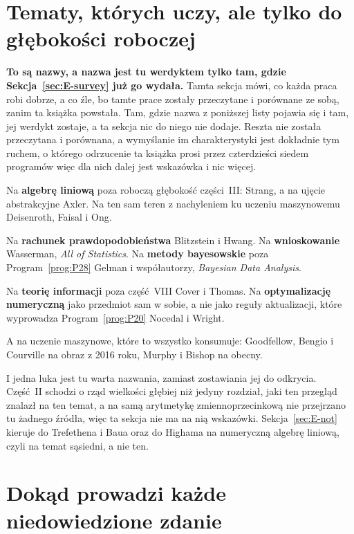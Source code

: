 \section{Tematy, których uczy, ale tylko do głębokości roboczej}
\label{sec:E-depth}

\begin{warning}
\textbf{To są nazwy, a nazwa jest tu werdyktem tylko tam, gdzie
Sekcja~\ref{sec:E-survey} już go wydała.} Tamta sekcja mówi, co każda praca
robi dobrze, a co źle, bo tamte prace zostały przeczytane i porównane ze sobą,
zanim ta książka powstała. Tam, gdzie nazwa z poniższej listy pojawia się i
tam, jej werdykt zostaje, a ta sekcja nic do niego nie dodaje. Reszta nie
została przeczytana i porównana, a wymyślanie im charakterystyki jest dokładnie
tym ruchem, o którego odrzucenie ta książka prosi przez czterdzieści siedem
programów \dash{} więc dla nich dalej jest wskazówka i nic więcej.
\end{warning}

\medskip
Na \textbf{algebrę liniową} poza roboczą głębokość części~III: Strang, a na
ujęcie abstrakcyjne Axler. Na ten sam teren z nachyleniem ku uczeniu
maszynowemu \dash{} Deisenroth, Faisal i Ong.

Na \textbf{rachunek prawdopodobieństwa} \dash{} Blitzstein i Hwang. Na
\textbf{wnioskowanie} \dash{} Wasserman, \emph{All of Statistics}. Na
\textbf{metody bayesowskie} poza Program~\ref{prog:P28} \dash{} Gelman i
współautorzy, \emph{Bayesian Data Analysis}.

Na \textbf{teorię informacji} poza część~VIII \dash{} Cover i Thomas. Na
\textbf{optymalizację numeryczną} jako przedmiot sam w sobie, a nie jako reguły
aktualizacji, które wyprowadza Program~\ref{prog:P20} \dash{} Nocedal i Wright.

A na uczenie maszynowe, które to wszystko konsumuje: Goodfellow, Bengio i
Courville na obraz z 2016 roku, Murphy i Bishop na obecny.

\medskip
I jedna luka jest tu warta nazwania, zamiast zostawiania jej do odkrycia.
Część~II schodzi o rząd wielkości głębiej niż jedyny rozdział, jaki ten
przegląd znalazł na ten temat, a na samą arytmetykę zmiennoprzecinkową nie
przejrzano tu żadnego źródła, więc ta sekcja nie ma na nią wskazówki.
Sekcja~\ref{sec:E-not} kieruje do Trefethena i Baua
oraz do Highama na numeryczną algebrę liniową, czyli na temat sąsiedni,
a nie ten.

\section{Dokąd prowadzi każde niedowiedzione zdanie}
\label{sec:E-route}

